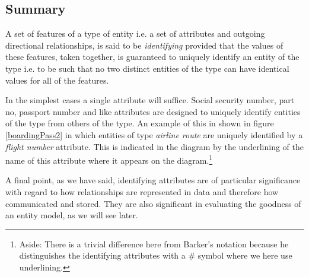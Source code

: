 \subsection{Summary}
\mynote A set of features of a type of entity i.e. a set of attributes and outgoing directional relationships, is said to be \textit{identifying} provided that the values of these features,
taken together, is guaranteed to uniquely identify an entity of the type i.e. to be such that no two distinct entities of the type can have identical values for all of the features. 

\mynote In the simplest cases a single attribute will suffice. 
Social security number, part no, 
passport number and like attributes are designed to uniquely identify entities of the type from others of the type. 
An example of this 
in  shown in figure \ref{boardingPass2} in which entities of type \textit{airline route} are uniquely identified by a \textit{flight number} attribute.
This is
indicated in the diagram  by the underlining of the name of this attribute where it appears on the diagram.\footnote{Aside: There is a trivial difference here from Barker's notation because he distinguishes the identifying attributes with a \# symbol where we here use  underlining.} 


\mynote A final point, as we have said, identifying attributes are of particular significance with regard to 
 how relationships are represented in data and therefore how communicated and stored.
They are also significant in evaluating the goodness of an entity model, as we will see later.





 

